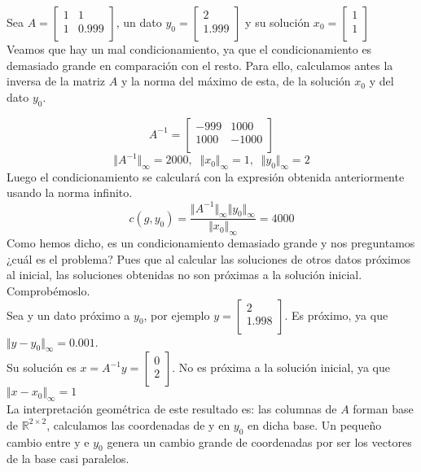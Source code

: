 \begin{ejemplo}
Sea $A = \begin{bmatrix}
1 & 1 \\
1 & 0.999 \\
\end{bmatrix}$,
un dato $y_0 = \begin{bmatrix}
2 \\
1.999 \\
\end{bmatrix}$
y su solución $x_0 = \begin{bmatrix}
1 \\
1 \\
\end{bmatrix}$\\

Veamos que hay un mal condicionamiento, ya que el condicionamiento es demasiado grande en comparación con el resto. Para ello, calculamos antes la inversa de la matriz $A$ y la norma del máximo de esta, de la solución $x_0$ y del dato $y_0$.

\[ A^{-1} = \begin{bmatrix}
-999 & 1000 \\
1000 & -1000 \\
\end{bmatrix} \]
\[ \Vert A^{-1} \Vert _\infty = 2000, \; \; \Vert x_0 \Vert _\infty = 1, \; \; \Vert y_0 \Vert _\infty = 2 \]
Luego el condicionamiento se calculará con la expresión obtenida anteriormente usando la norma infinito.
\[ c(g, y_0) = \frac{\Vert A^{-1} \Vert _\infty \Vert y_0 \Vert _\infty }{\Vert x_0 \Vert _\infty } = 4000 \]
Como hemos dicho, es un condicionamiento demasiado grande y nos preguntamos ¿cuál es el problema? Pues que al calcular las soluciones de otros datos próximos al inicial, las soluciones obtenidas no son próximas a la solución inicial. Comprobémoslo.\\
Sea y un dato próximo a $y_0$, por ejemplo $y = \begin{bmatrix}
2 \\
1.998 \\
\end{bmatrix}$.
Es próximo, ya que $\Vert y - y_0 \Vert _\infty = 0.001$.\\
Su solución es $x = A^{-1}y = \begin{bmatrix}
0 \\
2 \\
\end{bmatrix}$. No es próxima a la solución inicial, ya que $\Vert x - x_0 \Vert _\infty = 1$\\
La interpretación geométrica de este resultado es: las columnas de $A$ forman base de $\mathbb{R}^{2 \times 2}$, calculamos las coordenadas de y en $y_0$ en dicha base. Un pequeño cambio entre y e $y_0$ genera un cambio grande de coordenadas por ser los vectores de la base casi paralelos.
\end{ejemplo}

